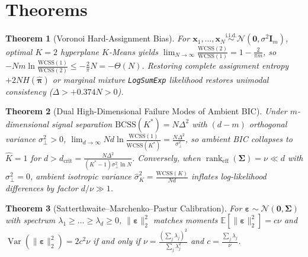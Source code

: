 \documentclass[11pt]{article}
\newtheorem{theorem}{Theorem}
\begin{document}
\section{Theorems}
\begin{theorem}[Voronoi Hard-Assignment Bias]
For $\mathbf{x}_1,\dots,\mathbf{x}_N \stackrel{\mathrm{i.i.d.}}{\sim} \mathcal{N}(\mathbf{0}, \sigma^2\mathbf{I}_m)$, optimal $K=2$ hyperplane $K$-Means yields $\lim_{N\to\infty}\frac{\mathrm{WCSS}(2)}{\mathrm{WCSS}(1)} = 1 - \frac{2}{\pi m}$, so $-Nm\ln\frac{\mathrm{WCSS}(1)}{\mathrm{WCSS}(2)} \le -\frac{2}{\pi}N = -\Theta(N)$. Restoring complete assignment entropy $+2NH(\hat{\bm{\pi}})$ or marginal mixture \texttt{LogSumExp} likelihood restores unimodal consistency ($\Delta > +0.374N > 0$).
\end{theorem}

\begin{theorem}[Dual High-Dimensional Failure Modes of Ambient BIC]
Under $m$-dimensional signal separation $\mathrm{BCSS}(K^*)=N\Delta^2$ with $(d-m)$ orthogonal variance $\sigma_\perp^2 > 0$, $\lim_{d\to\infty} Nd\ln\frac{\mathrm{WCSS}(1)}{\mathrm{WCSS}(K^*)} = \frac{N\Delta^2}{\sigma_\perp^2}$, so ambient BIC collapses to $\hat{K}=1$ for $d > d_{\mathrm{crit}} = \frac{N\Delta^2}{(K^*-1)\sigma_\perp^2\ln N}$. Conversely, when $\operatorname{rank}_{\mathrm{eff}}(\bm{\Sigma}) = \nu \ll d$ with $\sigma_\perp^2 = 0$, ambient isotropic variance $\hat{\sigma}_K^2 = \frac{\mathrm{WCSS}(K)}{Nd}$ inflates log-likelihood differences by factor $d/\nu \gg 1$.
\end{theorem}

\begin{theorem}[Satterthwaite--Marchenko--Pastur Calibration]
For $\bm{\varepsilon} \sim \mathcal{N}(\mathbf{0}, \bm{\Sigma})$ with spectrum $\lambda_1 \ge \dots \ge \lambda_d \ge 0$, $\|\bm{\varepsilon}\|_2^2$ matches moments $\mathbb{E}[\|\bm{\varepsilon}\|_2^2] = c\nu$ and $\operatorname{Var}(\|\bm{\varepsilon}\|_2^2) = 2c^2\nu$ if and only if $\nu = \frac{(\sum_j \lambda_j)^2}{\sum_j \lambda_j^2}$ and $c = \frac{\sum_j \lambda_j}{\nu}$.
\end{theorem}



\end{document}
